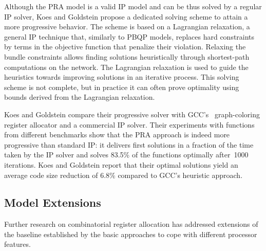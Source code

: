 \documentclass[acmsmall,authorversion,nonacm]{acmart}
\begin{document}
Although the PRA model is a valid IP model and can be thus solved by a
regular IP solver, Koes and Goldstein propose a dedicated solving
scheme to attain a more progressive behavior.
The scheme is based on a Lagrangian relaxation, a general IP technique
that, similarly to PBQP models, replaces hard constraints by terms in
the objective function that penalize their violation.
Relaxing the bundle constraints allows finding solutions heuristically
through shortest-path computations on the network.
The Lagrangian relaxation is used to guide the heuristics towards
improving solutions in an iterative process.
This solving scheme is not complete, but in practice it can often
prove optimality using bounds derived from the Lagrangian relaxation.

Koes and Goldstein compare their progressive solver with
GCC's~\cite{GCC2017} graph-coloring register allocator and a
commercial IP solver.
Their experiments with functions from different benchmarks show that
the PRA approach is indeed more progressive than standard IP: it
delivers first solutions in a fraction of the time taken by the IP
solver and solves 83.5\% of the functions optimally after~1000
iterations.
Koes and Goldstein report that their optimal solutions yield an
average code size reduction of 6.8\% compared to GCC's heuristic
approach.

\subsection{Model Extensions}\label{sec:model-extensions}

Further research on combinatorial register allocation has addressed
extensions of the baseline established by the basic approaches to cope
with different processor features.
\end{document}
